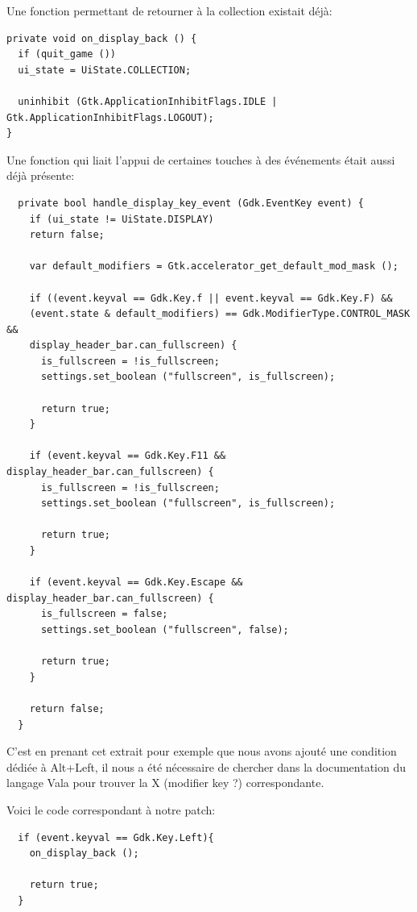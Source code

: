 \documentclass[12pt]{report}
\begin{document}
Une fonction permettant de retourner à la collection existait déjà:

\begin{verbatim}
private void on_display_back () {
  if (quit_game ())
  ui_state = UiState.COLLECTION;

  uninhibit (Gtk.ApplicationInhibitFlags.IDLE | Gtk.ApplicationInhibitFlags.LOGOUT);
}
\end{verbatim}

Une fonction qui liait l'appui de certaines touches à des événements
était aussi déjà présente:

\begin{verbatim}
  private bool handle_display_key_event (Gdk.EventKey event) {
    if (ui_state != UiState.DISPLAY)
    return false;

    var default_modifiers = Gtk.accelerator_get_default_mod_mask ();

    if ((event.keyval == Gdk.Key.f || event.keyval == Gdk.Key.F) &&
    (event.state & default_modifiers) == Gdk.ModifierType.CONTROL_MASK &&
    display_header_bar.can_fullscreen) {
      is_fullscreen = !is_fullscreen;
      settings.set_boolean ("fullscreen", is_fullscreen);

      return true;
    }

    if (event.keyval == Gdk.Key.F11 && display_header_bar.can_fullscreen) {
      is_fullscreen = !is_fullscreen;
      settings.set_boolean ("fullscreen", is_fullscreen);

      return true;
    }

    if (event.keyval == Gdk.Key.Escape && display_header_bar.can_fullscreen) {
      is_fullscreen = false;
      settings.set_boolean ("fullscreen", false);

      return true;
    }
    
    return false;
  }
\end{verbatim}

C'est en prenant cet extrait pour exemple que nous avons ajouté une
condition dédiée à Alt+Left, il nous a été nécessaire de chercher dans
la documentation du langage Vala pour trouver la X (modifier key ?)
correspondante.

Voici le code correspondant à notre patch:

\begin{verbatim}
  if (event.keyval == Gdk.Key.Left){			
    on_display_back ();
    
    return true;
  }
\end{verbatim}
\end{document}
